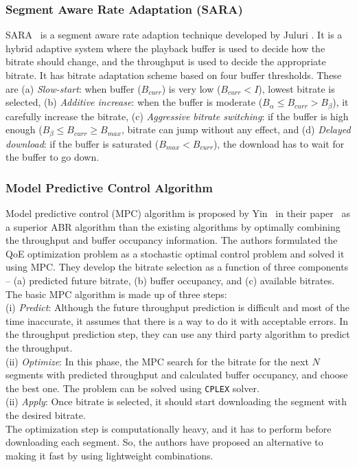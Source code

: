 \subsubsection{Segment Aware Rate Adaptation (SARA)}
SARA~\cite{7247436} is a segment aware rate adaption technique developed by Juluri \etal. It is a hybrid adaptive system where the playback buffer is used to decide how the bitrate should change, and the throughput is used to decide the appropriate bitrate. It has bitrate adaptation scheme based on four buffer thresholds. These are (a) \textit{Slow-start}: when buffer ($B_{curr}$) is very low ($B_{curr}<I$), lowest bitrate is selected, (b) \textit{Additive increase}: when the buffer is moderate ($B_{\alpha} \le B_{curr} > B_{\beta}$), it carefully increase the bitrate, (c) \textit{Aggressive bitrate switching}: if the buffer is high enough ($B_{\beta} \le B_{curr} \ge B_{max}$, bitrate can jump without any effect, and (d) \textit{Delayed download}: if the buffer is saturated ($B_{max} < B_{curr}$), the download has to wait for the buffer to go down.

\subsubsection{Model Predictive Control Algorithm}
Model predictive control (MPC) algorithm is proposed by Yin \etal\ in their paper~\cite{yin2015control,10.1145/2670518.2673877} as a superior ABR algorithm than the existing algorithms by optimally combining the throughput and buffer occupancy information. The authors formulated the QoE optimization problem as a stochastic optimal control problem and solved it using MPC. They develop the bitrate selection as a function of three components -- (a) predicted future bitrate, (b) buffer occupancy, and (c) available bitrates. The basic MPC algorithm is made up of three steps: \\
(i) \textit{Predict}: Although the future throughput prediction is difficult and most of the time inaccurate, it assumes that there is a way to do it with acceptable errors. In the throughput prediction step, they can use any third party algorithm to predict the throughput.\\
(ii) \textit{Optimize}: In this phase, the MPC search for the bitrate for the next $N$ segments with predicted throughput and calculated buffer occupancy, and choose the best one. The problem can be solved using {\tt CPLEX} solver.\\
(ii) \textit{Apply}: Once bitrate is selected, it should start downloading the segment with the desired bitrate.\\
The optimization step is computationally heavy, and it has to perform before downloading each segment. So, the authors have proposed an alternative to making it fast by using lightweight combinations.


